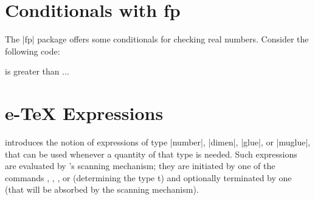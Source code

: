 %	  
%



\section{Conditionals with fp}


The |fp| package offers some conditionals for checking real numbers.
Consider the following code:

\begin{teXXX}
\FPset{}
\FPset{}

\FPifgt\test{} is greater than \limit
  \else ... \fi
\end{teXXX}

%
%




  
\section{e-TeX Expressions}

\etex introduces the notion of expressions of type |number|, |dimen|, |glue|, or
|muglue|, that can be used whenever a quantity of that type is needed. Such
expressions are evaluated by \etex's scanning mechanism; they are initiated by
one of the commands , , , or  
(determining the type t) and optionally terminated by one  (that will be absorbed
by the scanning mechanism). 

